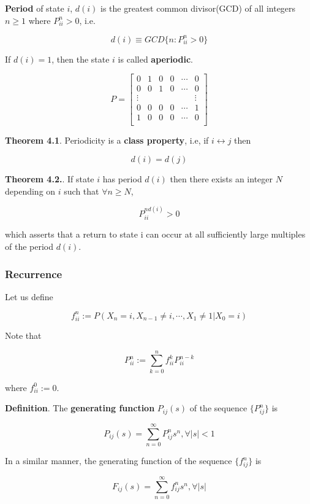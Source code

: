\documentclass[12pt]{article}
\theoremstyle{nonumberbreak}
\begin{document}
\textbf{Period} of state $i$, $d(i)$ is the greatest common divisor(GCD) of all integers $n \ge 1$ where $P^n_{ii} > 0$, i.e.

$$
d(i) \equiv GCD \{ n : P_{ii}^n > 0 \}
$$

If $d(i) = 1$, then the state $i$ is called \textbf{aperiodic}. 

$$
P = \begin{bmatrix}
0 & 1 & 0 & 0 & \cdots & 0 \\
0 & 0 & 1 & 0 & \cdots & 0 \\
\vdots &  &  &  &  & \vdots \\
0 & 0 & 0 & 0 & \cdots & 1 \\
1 & 0 & 0 & 0 & \cdots & 0 \\
\end{bmatrix}
$$



\begin{theorem}
\textbf{Theorem 4.1}. Periodicity is a \textbf{class property}, i.e, if $i \leftrightarrow j$ then

$$
d(i) = d(j)
$$

\textbf{Theorem 4.2.}. If state $i$ has period $d(i)$ then there exists an integer $N$ depending on $i$ such that $\forall n \ge N$,

$$
P_{ii}^{nd(i)} > 0
$$

which asserts that a return to state i can occur at all sufficiently large multiples of the period $d(i)$. 
\end{theorem}



\subsubsection*{Recurrence}

Let us define

$$
f_{ii}^n := P(X_n = i, X_{n-1} \neq i, \cdots, X_1 \neq 1 | X_0 = i)
$$

Note that 

$$
P_{ii}^n := \sum_{k=0}^n f_{ii}^k P_{ii}^{n-k}
$$

where $f_{ii}^0 := 0$. 


\begin{theorem}
\textbf{Definition}. The \textbf{generating function} $P_{ij}(s)$ of the sequence $\{ P_{ij}^n \}$ is 

$$
P_{ij} (s) = \sum_{n=0}^\infty P_{ij}^n s^n, \forall |s|<1
$$

In a similar manner, the generating function of the sequence $\{ f_{ij}^n \}$ is 

$$
F_{ij}(s) = \sum_{n=0}^\infty f_{ij}^n s^n, \forall |s|
$$
\end{theorem}
\end{document}
